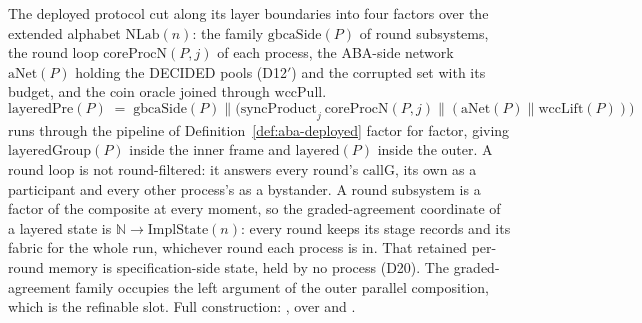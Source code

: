 \begin{definition}
  \label{def:aba-layered}
  \leanok
  The deployed protocol cut along its layer boundaries into four factors over the extended alphabet $\mathrm{NLab}(n)$: the family $\mathrm{gbcaSide}(P)$ of round subsystems, the round loop $\mathrm{coreProcN}(P,j)$ of each process, the ABA-side network $\mathrm{aNet}(P)$ holding the DECIDED pools (D12$'$) and the corrupted set with its budget, and the coin oracle joined through $\mathrm{wccPull}$.
  \[
    \mathrm{layeredPre}(P) \;=\;
      \mathrm{gbcaSide}(P) \parallel \bigl(\mathrm{syncProduct}_{j}\ \mathrm{coreProcN}(P,j)
        \parallel (\mathrm{aNet}(P) \parallel \mathrm{wccLift}(P))\bigr)
  \]
  runs through the pipeline of Definition~\ref{def:aba-deployed} factor for factor, giving $\mathrm{layeredGroup}(P)$ inside the inner frame and $\mathrm{layered}(P)$ inside the outer.
  A round loop is not round-filtered: it answers every round's $\mathrm{callG}$, its own as a participant and every other process's as a bystander.
  A round subsystem is a factor of the composite at every moment, so the graded-agreement coordinate of a layered state is $\mathbb{N} \to \mathrm{ImplState}(n)$: every round keeps its stage records and its fabric for the whole run, whichever round each process is in.
  That retained per-round memory is specification-side state, held by no process (D20).
  The graded-agreement family occupies the left argument of the outer parallel composition, which is the refinable slot.
  Full construction: , over  and .
\end{definition}
